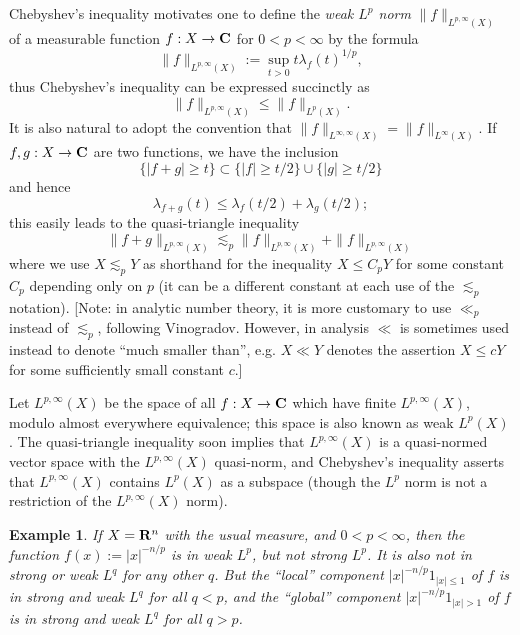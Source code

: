 \documentclass[10pt,reqno]{amsart}
\newtheorem{example}[theorem]{Example}
\begin{document}
Chebyshev’s inequality motivates one to define the \emph{weak $L^p$ norm} $\|f\|_{L^{p,\infty}(X)}$ of a measurable function $f: X \rightarrow {\bf C}$ for $0 < p < \infty$ by the formula
%
\[ \|f\|_{L^{p,\infty}(X)} := \sup_{t > 0} t \lambda_f(t)^{1/p},\]
%
thus Chebyshev’s inequality can be expressed succinctly as
%
\[ \|f\|_{L^{p,\infty}(X)} \leq \|f\|_{L^p(X)}.\]
%
It is also natural to adopt the convention that $\|f\|_{L^{\infty,\infty}(X)} = \|f\|_{L^\infty(X)}$. If $f, g: X \rightarrow {\bf C}$ are two functions, we have the inclusion
%
\[ \{ |f+g| \geq t \} \subset \{ |f| \geq t/2\} \cup \{ |g| \geq t/2 \}\]
%
and hence
%
\[ \lambda_{f+g}(t) \leq \lambda_f(t/2) + \lambda_g(t/2);\]
%
this easily leads to the quasi-triangle inequality
%
\[ \|f+g\|_{L^{p,\infty}(X)} \lesssim_p \|f\|_{L^{p,\infty}(X)} + \|f\|_{L^{p,\infty}(X)}\]
%
where we use $X \lesssim_p Y$ as shorthand for the inequality $X \leq C_p Y$ for some constant $C_p$ depending only on $p$ (it can be a different constant at each use of the $\lesssim_p$ notation). [Note: in analytic number theory, it is more customary to use $\ll_p$ instead of $\lesssim_p$, following Vinogradov. However, in analysis $\ll$ is sometimes used instead to denote “much smaller than”, e.g. $X \ll Y$ denotes the assertion $X \leq cY$ for some sufficiently small constant $c$.]

Let $L^{p,\infty}(X)$ be the space of all $f: X \rightarrow {\bf C}$ which have finite $L^{p,\infty}(X)$, modulo almost everywhere equivalence; this space is also known as weak $L^p(X)$. The quasi-triangle inequality soon implies that $L^{p,\infty}(X)$ is a quasi-normed vector space with the $L^{p,\infty}(X)$ quasi-norm, and Chebyshev’s inequality asserts that $L^{p,\infty}(X)$ contains $L^p(X)$ as a subspace (though the $L^p$ norm is not a restriction of the $L^{p,\infty}(X)$ norm).

\begin{example}
    If $X = {\bf R}^n$ with the usual measure, and $0 < p < \infty$, then the function $f(x) := |x|^{-n/p}$ is in weak $L^p$, but not strong $L^p$. It is also not in strong or weak $L^q$ for any other $q$. But the “local” component $|x|^{-n/p} 1_{|x| \leq 1}$ of $f$ is in strong and weak $L^q$ for all $q < p$, and the “global” component $|x|^{-n/p} 1_{|x| > 1}$ of $f$ is in strong and weak $L^q$ for all $q > p$. 
\end{example}
\end{document}
